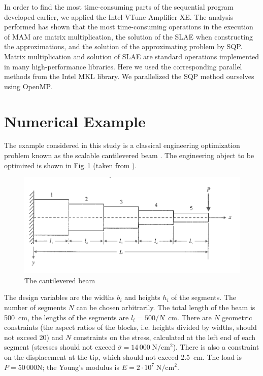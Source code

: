 \documentclass[a4paper]{llncs}
\begin{document}
In order to find the most time-consuming parts of the sequential program
developed earlier, we applied the Intel VTune Amplifier XE. The analysis
performed has shown that the most time-consuming operations in the execution of
MAM are matrix multiplication, the solution of the SLAE when constructing the
approximations, and the solution of the approximating problem by SQP. Matrix
multiplication and solution of SLAE are standard operations implemented in many
high-performance libraries. Here we used the corresponding parallel methods
from the Intel MKL library. We parallelized the SQP method ourselves using
OpenMP.

\section{Numerical Example}
\label{sec:num_example}

The example considered in this study is a classical engineering optimization
problem known as the scalable cantilevered beam \cite{Vanderpllaats2001}. The
engineering object to be optimized is shown in Fig.\,\ref{fig:beam} (taken from
\cite{Vanderpllaats2001}).

\begin{figure}[ht]
    \centering
    \includegraphics[width=1.0\textwidth]{beam.png}
    \caption{The cantilevered beam}
    \label{fig:beam}
\end{figure}

The design variables are the widths $b_i$ and heights $h_i$ of the segments.
The number of segments $N$ can be chosen arbitrarily. The total length of the
beam is 500~cm, the lengths of the segments are $l_i=500/N$~cm. There are $N$
geometric constraints (the aspect ratios of the blocks, i.e. heights divided by
widths, should not exceed 20) and $N$ constraints on the stress, calculated at
the left end of each segment (stresses should not exceed
$\bar{\sigma}=14\,000\;\text{N}/\text{cm}^2$). There is also a constraint on
the displacement at the tip, which should not exceed 2.5~cm. The load is $P =
50\,000$\;N; the Young's modulus is $E=2\cdot 10^7\;\text{N}/\text{cm}^2$.
\end{document}
